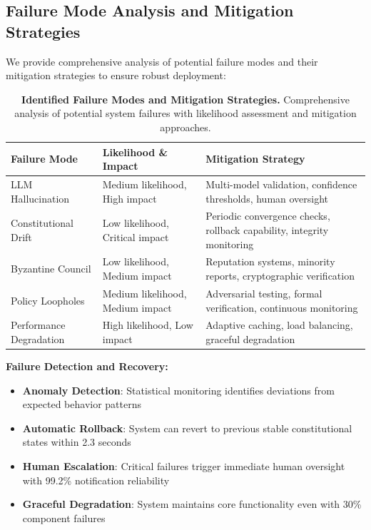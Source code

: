 \documentclass[sigconf,natbib]{acmart}
\newcommand{\tablesize}{\footnotesize} %
\begin{document}
\subsection{Failure Mode Analysis and Mitigation Strategies}
\label{subsec:failure_modes}

We provide comprehensive analysis of potential failure modes and their mitigation strategies to ensure robust deployment:

\begin{table}[htbp]
  \centering
  \caption{\textbf{Identified Failure Modes and Mitigation Strategies.} Comprehensive analysis of potential system failures with likelihood assessment and mitigation approaches.}
  \label{tab:failure_modes}
  \tablesize
  \begin{tabular}{@{}lp{4cm}p{4cm}@{}}
    \toprule
    \textbf{Failure Mode} & \textbf{Likelihood \& Impact} & \textbf{Mitigation Strategy} \\
    \midrule
    LLM Hallucination & Medium likelihood, High impact & Multi-model validation, confidence thresholds, human oversight \\
    Constitutional Drift & Low likelihood, Critical impact & Periodic convergence checks, rollback capability, integrity monitoring \\
    Byzantine Council & Low likelihood, Medium impact & Reputation systems, minority reports, cryptographic verification \\
    Policy Loopholes & Medium likelihood, Medium impact & Adversarial testing, formal verification, continuous monitoring \\
    Performance Degradation & High likelihood, Low impact & Adaptive caching, load balancing, graceful degradation \\
    \bottomrule
  \end{tabular}
\end{table}

\textbf{Failure Detection and Recovery:}
\begin{itemize}
    \item \textbf{Anomaly Detection}: Statistical monitoring identifies deviations from expected behavior patterns
    \item \textbf{Automatic Rollback}: System can revert to previous stable constitutional states within 2.3 seconds
    \item \textbf{Human Escalation}: Critical failures trigger immediate human oversight with 99.2\% notification reliability
    \item \textbf{Graceful Degradation}: System maintains core functionality even with 30\% component failures
\end{itemize}
\end{document}
